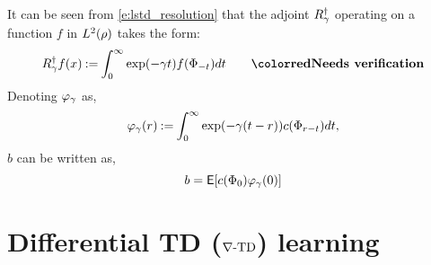 It can be seen from \eqref{e:lstd_resolution} that the adjoint $R^\dagger_\gamma$ operating on a function $f$ in $L^2(\rho)$ takes the form:
\[
R^\dagger_\discount f(x) \eqdef \int_0^\infty \exp(-\discount t ) f(\markovstate_{-t}) dt \qquad \textbf{\rd{Needs verification}}
\]
Denoting $\varphi_\gamma$ as,
\[
\varphi_\gamma(r) \mathbin{:=} \int_0^\infty \exp(-\gamma (t -r)) c(\Phi_{r-t}) dt,
\]
$b$ can be written as,
\begin{equation}
b = \Expect[c(\markovstate_0) \eligibvector_\discount(0)]
\label{e:lstd_b}
\end{equation}


\section{Differential TD ($\nabla\text{-TD}$) learning}
\label{diff_td_learning}

